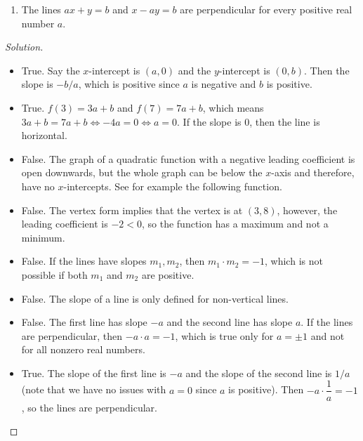 \documentclass[12pt]{article}
\newenvironment{solution}{\begin{proof}[Solution]}{\end{proof}}
\begin{document}
\begin{enumerate}
\begin{enumerate}
			\item The lines $ax+y=b$ and $x-ay=b$ are perpendicular for every positive real number $a$.
			
		\end{enumerate}
		
		\begin{solution}
			\begin{itemize}
				\item[(a)] 	True. Say the $x$-intercept is $(a,0)$ and the $y$-intercept is $(0,b)$. Then the slope is $-b/a$, which is positive since $a$ is negative and $b$ is positive.
				\item[(b)] 	True. $f(3)=3a+b$ and $f(7)=7a+b$, which means $3a+b=7a+b \iff -4a=0 \iff a=0$. If the slope is 0, then the line is horizontal.
				\item[(c)] 	False. The graph of a quadratic function with a negative leading coefficient is open downwards, but the whole graph can be below the $x$-axis and therefore, have no $x$-intercepts. See for example the following function.
				
				\item[(d)] 	False. The vertex form implies that the vertex is at $(3,8)$, however, the leading coefficient is $-2<0$, so the function has a maximum and not a minimum.
				\item[(e)] False. If the lines have slopes $m_1, m_2$, then $m_1\cdot m_2=-1$, which is not possible if both $m_1$ and $m_2$ are positive.
				\item[(f)] False. The slope of a line is only defined for non-vertical lines.
				\item[(g)] 	False. The first line has slope $-a$ and the second line has slope $a$. If the lines are perpendicular, then $-a\cdot a=-1$, which is true only for $a=\pm1$ and not for all nonzero real numbers.
				\item[(h)] True. The slope of the first line is $-a$ and the slope of the second line is $1/a$ (note that we have no issues with $a=0$ since $a$ is positive). Then $-a\cdot \dfrac{1}{a}=-1$, so the lines are perpendicular.
			\end{itemize}
		\end{solution}
		
	\end{enumerate}
	
\end{document}
